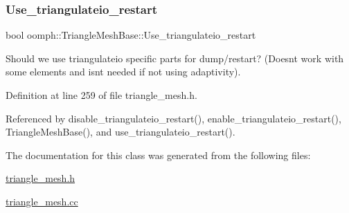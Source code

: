 \mbox{\label{classoomph_1_1TriangleMeshBase_a503839a1350bee25717570fbf504a2e1}} 
\subsubsection{\texorpdfstring{Use\+\_\+triangulateio\+\_\+restart}{Use\_triangulateio\_restart}}
{\footnotesize\ttfamily bool oomph\+::\+Triangle\+Mesh\+Base\+::\+Use\+\_\+triangulateio\+\_\+restart\hspace{0.3cm}{\ttfamily [protected]}}

Should we use triangulateio specific parts for dump/restart? (Doesn\textquotesingle{}t work with some elements and isn\textquotesingle{}t needed if not using adaptivity). 

Definition at line 259 of file triangle\+\_\+mesh.\+h.



Referenced by disable\+\_\+triangulateio\+\_\+restart(), enable\+\_\+triangulateio\+\_\+restart(), Triangle\+Mesh\+Base(), and use\+\_\+triangulateio\+\_\+restart().



The documentation for this class was generated from the following files\+:\begin{DoxyCompactItemize}
\item 
\hyperlink{triangle__mesh_8h}{triangle\+\_\+mesh.\+h}\item 
\hyperlink{triangle__mesh_8cc}{triangle\+\_\+mesh.\+cc}\end{DoxyCompactItemize}
